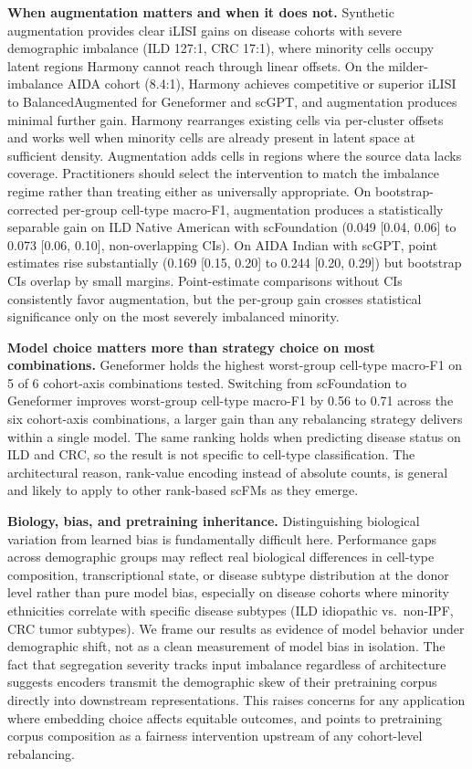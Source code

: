 \documentclass[sigconf]{acmart}
\begin{document}
\textbf{When augmentation matters and when it does not.} Synthetic augmentation provides clear iLISI gains on disease cohorts with severe demographic imbalance (ILD 127:1, CRC 17:1), where minority cells occupy latent regions Harmony cannot reach through linear offsets. On the milder-imbalance AIDA cohort (8.4:1), Harmony achieves competitive or superior iLISI to BalancedAugmented for Geneformer and scGPT, and augmentation produces minimal further gain. Harmony rearranges existing cells via per-cluster offsets and works well when minority cells are already present in latent space at sufficient density. Augmentation adds cells in regions where the source data lacks coverage. Practitioners should select the intervention to match the imbalance regime rather than treating either as universally appropriate. On bootstrap-corrected per-group cell-type macro-F1, augmentation produces a statistically separable gain on ILD Native American with scFoundation (0.049 [0.04, 0.06] to 0.073 [0.06, 0.10], non-overlapping CIs). On AIDA Indian with scGPT, point estimates rise substantially (0.169 [0.15, 0.20] to 0.244 [0.20, 0.29]) but bootstrap CIs overlap by small margins. Point-estimate comparisons without CIs consistently favor augmentation, but the per-group gain crosses statistical significance only on the most severely imbalanced minority.

\textbf{Model choice matters more than strategy choice on most combinations.} Geneformer holds the highest worst-group cell-type macro-F1 on 5 of 6 cohort-axis combinations tested. Switching from scFoundation to Geneformer improves worst-group cell-type macro-F1 by 0.56 to 0.71 across the six cohort-axis combinations, a larger gain than any rebalancing strategy delivers within a single model. The same ranking holds when predicting disease status on ILD and CRC, so the result is not specific to cell-type classification. The architectural reason, rank-value encoding instead of absolute counts, is general and likely to apply to other rank-based scFMs as they emerge.

\textbf{Biology, bias, and pretraining inheritance.} Distinguishing biological variation from learned bias is fundamentally difficult here. Performance gaps across demographic groups may reflect real biological differences in cell-type composition, transcriptional state, or disease subtype distribution at the donor level rather than pure model bias, especially on disease cohorts where minority ethnicities correlate with specific disease subtypes (ILD idiopathic vs.\ non-IPF, CRC tumor subtypes). We frame our results as evidence of model behavior under demographic shift, not as a clean measurement of model bias in isolation. The fact that segregation severity tracks input imbalance regardless of architecture suggests encoders transmit the demographic skew of their pretraining corpus directly into downstream representations. This raises concerns for any application where embedding choice affects equitable outcomes, and points to pretraining corpus composition as a fairness intervention upstream of any cohort-level rebalancing.
\end{document}
